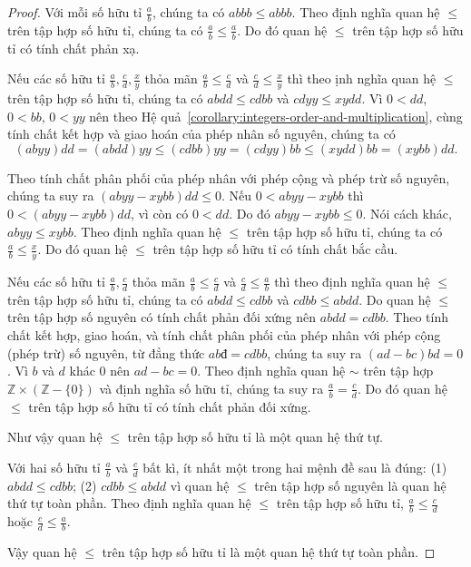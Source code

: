 \begin{proof}
    Với mỗi số hữu tỉ $\frac{a}{b}$, chúng ta có $abbb\leq abbb$. Theo định nghĩa quan hệ $\leq$ trên tập hợp số hữu tỉ, chúng ta có $\frac{a}{b}\leq\frac{a}{b}$. Do đó quan hệ $\leq$ trên tập hợp số hữu tỉ có tính chất phản xạ.

    Nếu các số hữu tỉ $\frac{a}{b}, \frac{c}{d}, \frac{x}{y}$ thỏa mãn $\frac{a}{b}\leq \frac{c}{d}$ và $\frac{c}{d}\leq\frac{x}{y}$ thì theo ịnh nghĩa quan hệ $\leq$ trên tập hợp số hữu tỉ, chúng ta có $abdd \leq cdbb$ và $cdyy \leq xydd$. Vì $0 < dd$, $0 < bb$, $0 < yy$ nên theo Hệ quả~\ref{corollary:integers-order-and-multiplication}, cùng tính chất kết hợp và giao hoán của phép nhân số nguyên, chúng ta có
    \[
        (abyy)dd = (abdd)yy \leq (cdbb)yy = (cdyy)bb \leq (xydd)bb = (xybb)dd.
    \]

    Theo tính chất phân phối của phép nhân với phép cộng và phép trừ số nguyên, chúng ta suy ra $(abyy - xybb)dd\leq 0$. Nếu $0 < abyy - xybb$ thì $0 < (abyy - xybb)dd$, vì còn có $0 < dd$. Do đó $abyy - xybb \leq 0$. Nói cách khác, $abyy\leq xybb$. Theo định nghĩa quan hệ $\leq$ trên tập hợp số hữu tỉ, chúng ta có $\frac{a}{b}\leq \frac{x}{y}$. Do đó quan hệ $\leq$ trên tập hợp số hữu tỉ có tính chất bắc cầu.

    Nếu các số hữu tỉ $\frac{a}{b}, \frac{c}{d}$ thỏa mãn $\frac{a}{b}\leq \frac{c}{d}$ và $\frac{c}{d}\leq\frac{a}{b}$ thì theo định nghĩa quan hệ $\leq$ trên tập hợp số hữu tỉ, chúng ta có $abdd\leq cdbb$ và $cdbb\leq abdd$. Do quan hệ $\leq$ trên tập hợp số nguyên có tính chất phản đối xứng nên $abdd = cdbb$. Theo tính chất kết hợp, giao hoán, và tính chất phân phối của phép nhân với phép cộng (phép trừ) số nguyên, từ đẳng thức $abđ = cdbb$, chúng ta suy ra $(ad - bc)bd = 0$. Vì $b$ và $d$ khác $0$ nên $ad - bc = 0$. Theo định nghĩa quan hệ $\sim$ trên tập hợp $\mathbb{Z}\times(\mathbb{Z} - \{0\})$ và định nghĩa số hữu tỉ, chúng ta suy ra $\frac{a}{b} = \frac{c}{d}$. Do đó quan hệ $\leq$ trên tập hợp số hữu tỉ có tính chất phản đối xứng.

    Như vậy quan hệ $\leq$ trên tập hợp số hữu tỉ là một quan hệ thứ tự.

    Với hai số hữu tỉ $\frac{a}{b}$ và $\frac{c}{d}$ bất kì, ít nhất một trong hai mệnh đề sau là đúng: (1) $abdd \leq cdbb$; (2) $cdbb \leq abdd$ vì quan hệ $\leq$ trên tập hợp số nguyên là quan hệ thứ tự toàn phần. Theo định nghĩa quan hệ $\leq$ trên tập hợp số hữu tỉ, $\frac{a}{b}\leq\frac{c}{d}$ hoặc $\frac{c}{d}\leq\frac{a}{b}$.

    Vậy quan hệ $\leq$ trên tập hợp số hữu tỉ là một quan hệ thứ tự toàn phần.
\end{proof}

